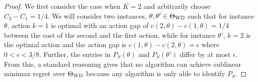 \begin{proof}
We first consider the case when $K=2$ and arbitrarily choose $C_2 - C_1 = 1/4$. 
We will consider two instances, $\theta,\theta'\in \Theta_{\mathrm{WD}}$ such that for instance $\theta$, 
action $k=1$ is optimal with an action gap of $c(2,\theta) - c(1,\theta) = 1/4$ between the cost of the second and the first
action,  while for instance $\theta'$, $k=2$ is the optimal action and the action gap is $c(1,\theta) - c(2,\theta) = \epsilon$
where $0<\epsilon<3/8$.
Further, the entries in $P_S(\theta)$ and $P_S(\theta')$ differ by at most $\epsilon$. 
From this, a standard reasoning gives that no algorithm can achieve sublinear minimax regret over $\Theta_{\mathrm{WD}}$ because any
algorithm is only able to identify $P_S$. 


\end{proof}

